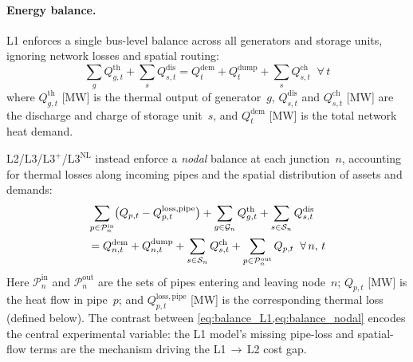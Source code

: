 \documentclass[a4paper,fleqn]{cas-dc}
\newcommand{\Lplus}{\mathrm{L3}^{+}}
\newcommand{\Lnl}{\mathrm{L3}^{\mathrm{NL}}}
\begin{document}
\paragraph{Energy balance.}
L1 enforces a single bus-level balance across all generators and
storage units, ignoring network losses and spatial routing:
%
\begin{equation}
  \sum_{g} Q_{g,t}^{\mathrm{th}}
    + \sum_{s} Q_{s,t}^{\mathrm{dis}}
  = Q_t^{\mathrm{dem}} + Q_t^{\mathrm{dump}}
    + \sum_{s} Q_{s,t}^{\mathrm{ch}}
  \;\; \forall\, t
  \label{eq:balance_L1}
\end{equation}
%
where $Q_{g,t}^{\mathrm{th}}$ [MW] is the thermal output of
generator~$g$, $Q_{s,t}^{\mathrm{dis}}$ and $Q_{s,t}^{\mathrm{ch}}$
[MW] are the discharge and charge of storage unit~$s$, and
$Q_t^{\mathrm{dem}}$ [MW] is the total network heat demand.

L2/L3/$\Lplus$/$\Lnl$ instead enforce a \emph{nodal} balance at
each junction~$n$, accounting for thermal losses along incoming
pipes and the spatial distribution of assets and demands:
%
\begin{align}
  &\sum_{p \in \mathcal{P}_n^{\mathrm{in}}}
    \bigl(Q_{p,t} - Q_{p,t}^{\mathrm{loss,pipe}}\bigr)
  + \sum_{g \in \mathcal{G}_n} Q_{g,t}^{\mathrm{th}}
  + \sum_{s \in \mathcal{S}_n} Q_{s,t}^{\mathrm{dis}} \notag \\
  &= Q_{n,t}^{\mathrm{dem}} + Q_{n,t}^{\mathrm{dump}}
  + \sum_{s \in \mathcal{S}_n} Q_{s,t}^{\mathrm{ch}}
  + \sum_{p \in \mathcal{P}_n^{\mathrm{out}}} Q_{p,t}
  \;\; \forall\, n,\, t
  \label{eq:balance_nodal}
\end{align}
%
Here $\mathcal{P}_n^{\mathrm{in}}$ and $\mathcal{P}_n^{\mathrm{out}}$
are the sets of pipes entering and leaving node~$n$;
$Q_{p,t}$ [MW] is the heat flow in pipe~$p$; and
$Q_{p,t}^{\mathrm{loss,pipe}}$ [MW] is the corresponding thermal
loss (defined below). The contrast between
\cref{eq:balance_L1,eq:balance_nodal} encodes the central
experimental variable: the L1 model's missing pipe-loss and
spatial-flow terms are the mechanism driving the L1\,$\to$\,L2
cost gap.
\end{document}
